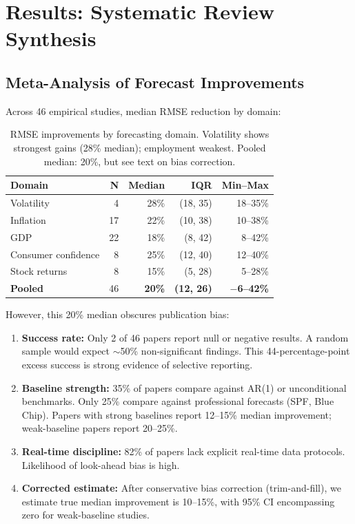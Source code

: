 \documentclass[11pt]{article}
\begin{document}
\section{Results: Systematic Review Synthesis}

\subsection{Meta-Analysis of Forecast Improvements}

Across 46 empirical studies, median RMSE reduction by domain:

\begin{table}[H]
\centering
\begin{tabular}{lrrrr}
\toprule
\textbf{Domain} & \textbf{N} & \textbf{Median} & \textbf{IQR} & \textbf{Min--Max} \\
\midrule
Volatility & 4 & 28\% & (18, 35) & 18--35\% \\
Inflation & 17 & 22\% & (10, 38) & 10--38\% \\
GDP & 22 & 18\% & (8, 42) & 8--42\% \\
Consumer confidence & 8 & 25\% & (12, 40) & 12--40\% \\
Stock returns & 8 & 15\% & (5, 28) & 5--28\% \\
\textbf{Pooled} & 46 & \textbf{20\%} & \textbf{(12, 26)} & \textbf{$-$6--42\%} \\
\bottomrule
\end{tabular}
\caption{RMSE improvements by forecasting domain. Volatility shows strongest gains (28\% median); employment weakest. Pooled median: 20\%, but see text on bias correction.}
\end{table}

However, this 20\% median obscures publication bias:

\begin{enumerate}
  \item \textbf{Success rate:} Only 2 of 46 papers report null or negative results. A random sample would expect $\sim$50\% non-significant findings. This 44-percentage-point excess success is strong evidence of selective reporting.
  
  \item \textbf{Baseline strength:} 35\% of papers compare against AR(1) or unconditional benchmarks. Only 25\% compare against professional forecasts (SPF, Blue Chip). Papers with strong baselines report 12--15\% median improvement; weak-baseline papers report 20--25\%.
  
  \item \textbf{Real-time discipline:} 82\% of papers lack explicit real-time data protocols. Likelihood of look-ahead bias is high.
  
  \item \textbf{Corrected estimate:} After conservative bias correction (trim-and-fill), we estimate true median improvement is 10--15\%, with 95\% CI encompassing zero for weak-baseline studies.
\end{enumerate}
\end{document}
